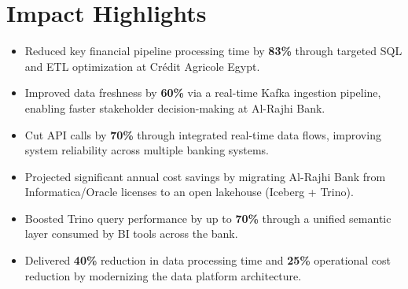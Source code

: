 \section{Impact Highlights}

\begin{itemize}
  \item Reduced key financial pipeline processing time by \textbf{83\%} through targeted SQL
        and ETL optimization at Crédit Agricole Egypt.

  \item Improved data freshness by \textbf{60\%} via a real-time Kafka ingestion pipeline,
        enabling faster stakeholder decision-making at Al-Rajhi Bank.

  \item Cut API calls by \textbf{70\%} through integrated real-time data flows, improving
        system reliability across multiple banking systems.

  \item Projected significant annual cost savings by migrating Al-Rajhi Bank from
        Informatica/Oracle licenses to an open lakehouse (Iceberg + Trino).

  \item Boosted Trino query performance by up to \textbf{70\%} through a unified semantic
        layer consumed by BI tools across the bank.

  \item Delivered \textbf{40\%} reduction in data processing time and \textbf{25\%}
        operational cost reduction by modernizing the data platform architecture.
\end{itemize}
